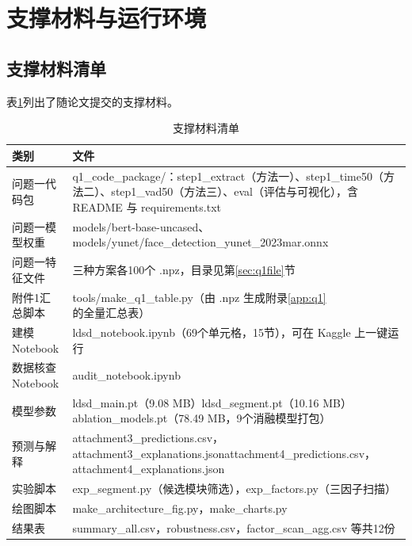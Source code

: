 \section{支撑材料与运行环境}\label{app:env}

\subsection{支撑材料清单}

表\ref{tab:files}列出了随论文提交的支撑材料。

\begin{table}[htbp]
\centering
\caption{支撑材料清单}
\label{tab:files}
\begin{tabularx}{\textwidth}{l>{\raggedright\arraybackslash}X}
\toprule
类别 & 文件 \\
\midrule
问题一代码包 & q1\_code\_package/：step1\_extract（方法一）、step1\_time50（方法二）、step1\_vad50（方法三）、eval（评估与可视化），含 README 与 requirements.txt \\
问题一模型权重 & models/bert-base-uncased、models/yunet/face\_detection\_yunet\_2023mar.onnx \\
问题一特征文件 & 三种方案各100个 .npz，目录见第\ref{sec:q1file}节 \\
附件1汇总脚本 & tools/make\_q1\_table.py（由 .npz 生成附录\ref{app:q1}的全量汇总表） \\
建模 Notebook & ldsd\_notebook.ipynb（69个单元格，15节），可在 Kaggle 上一键运行 \\
数据核查 Notebook & audit\_notebook.ipynb \\
模型参数 & ldsd\_main.pt（9.08 MB）\newline ldsd\_segment.pt（10.16 MB）\newline ablation\_models.pt（78.49 MB，9个消融模型打包） \\
预测与解释 & attachment3\_predictions.csv，attachment3\_explanations.json\newline attachment4\_predictions.csv，attachment4\_explanations.json \\
实验脚本 & exp\_segment.py（候选模块筛选），exp\_factors.py（三因子扫描） \\
绘图脚本 & make\_architecture\_fig.py，make\_charts.py \\
结果表 & summary\_all.csv，robustness.csv，factor\_scan\_agg.csv 等共12份 \\
\bottomrule
\end{tabularx}
\end{table}


